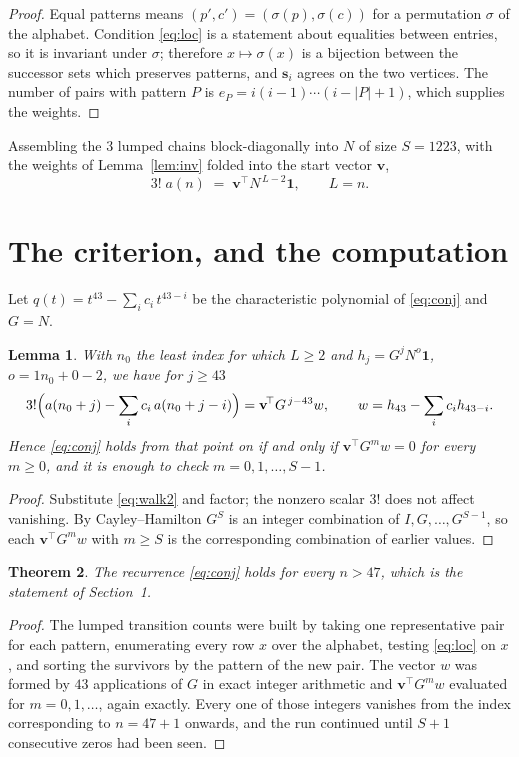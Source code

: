 \documentclass[11pt,a4paper]{article}
\theoremstyle{plain}
\newtheorem{theorem}{Theorem}
\newtheorem{lemma}[theorem]{Lemma}
\theoremstyle{definition}
\begin{document}
\begin{proof}
Equal patterns means $(p',c')=(\sigma(p),\sigma(c))$ for a permutation $\sigma$ of the
alphabet. Condition \eqref{eq:loc} is a statement about equalities between entries, so it is
invariant under $\sigma$; therefore $x\mapsto\sigma(x)$ is a bijection between the successor
sets which preserves patterns, and $\mathbf{s}_i$ agrees on the two vertices. The number of
pairs with pattern $P$ is $e_P=i(i-1)\cdots(i-|P|+1)$, which supplies the weights.
\end{proof}

Assembling the $3$ lumped chains block-diagonally into $N$ of size $S=1223$, with the
weights of Lemma~\ref{lem:inv} folded into the start vector $\mathbf{v}$,
\begin{equation}\label{eq:walk2}
3!\;a(n)\;=\;\mathbf{v}^{\!\top}N^{\,L-2}\mathbf{1},\qquad L=n .
\end{equation}

\section{The criterion, and the computation}

Let $q(t)=t^{43}-\sum_i c_i\,t^{43-i}$ be the characteristic polynomial of
\eqref{eq:conj} and $G=N$.

\begin{lemma}\label{lem:crit}
With $n_0$ the least index for which $L\ge2$ and $h_j=G^{j}N^{o}\mathbf{1}$,
$o=1n_0+0-2$, we have for $j\ge43$
\[
3!\Bigl(a(n_0+j)-\sum_i c_i\,a(n_0+j-i)\Bigr)
=\mathbf{v}^{\!\top}G^{\,j-43}w,\qquad
w=h_{43}-\sum_i c_i h_{43-i} .
\]
Hence \eqref{eq:conj} holds from that point on if and only if
$\mathbf{v}^{\!\top}G^{m}w=0$ for every $m\ge0$, and it is enough to check
$m=0,1,\dots,S-1$.
\end{lemma}

\begin{proof}
Substitute \eqref{eq:walk2} and factor; the nonzero scalar $3!$ does not affect
vanishing. By Cayley--Hamilton $G^{S}$ is an integer combination of $I,G,\dots,G^{S-1}$,
so each $\mathbf{v}^{\!\top}G^{m}w$ with $m\ge S$ is the corresponding combination of
earlier values.
\end{proof}

\begin{theorem}
The recurrence \eqref{eq:conj} holds for every $n>47$, which is the statement of
Section~1.
\end{theorem}

\begin{proof}
The lumped transition counts were built by taking one representative pair for each pattern,
enumerating every row $x$ over the alphabet, testing \eqref{eq:loc} on $x$, and sorting
the survivors by the pattern of the new pair. The vector $w$ was formed by $43$
applications of $G$ in exact integer arithmetic and $\mathbf{v}^{\!\top}G^{m}w$
evaluated for $m=0,1,\dots$, again exactly. Every one of those integers vanishes from the
index corresponding to $n=47+1$ onwards, and the run continued until $S+1$ consecutive
zeros had been seen.
\end{proof}
\end{document}
